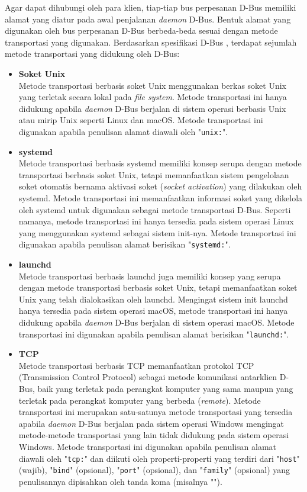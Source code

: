 Agar dapat dihubungi oleh para klien, tiap-tiap bus perpesanan D-Bus memiliki alamat yang diatur pada awal penjalanan \textit{daemon} D-Bus. Bentuk alamat yang digunakan oleh bus perpesanan D-Bus berbeda-beda sesuai dengan metode transportasi yang digunakan. Berdasarkan spesifikasi D-Bus \cite{dbus-specification}, terdapat sejumlah metode transportasi yang didukung oleh D-Bus:
\begin{itemize}
    \item \textbf{Soket Unix}\\
    Metode transportasi berbasis soket Unix menggunakan berkas soket Unix yang terletak secara lokal pada \textit{file system}. Metode transportasi ini hanya didukung apabila \textit{daemon} D-Bus berjalan di sistem operasi berbasis Unix atau mirip Unix seperti Linux dan macOS. Metode transportasi ini digunakan apabila penulisan alamat diawali oleh "\verb|unix:|".

    \item \textbf{systemd}\\
    Metode transportasi berbasis systemd memiliki konsep serupa dengan metode transportasi berbasis soket Unix, tetapi memanfaatkan sistem pengelolaan soket otomatis bernama aktivasi soket (\textit{socket activation}) yang dilakukan oleh systemd. Metode transportasi ini memanfaatkan informasi soket yang dikelola oleh systemd untuk digunakan sebagai metode transportasi D-Bus. Seperti namanya, metode transportasi ini hanya tersedia pada sistem operasi Linux yang menggunakan systemd sebagai sistem init-nya. Metode transportasi ini digunakan apabila penulisan alamat berisikan "\verb|systemd:|".
    
    \item \textbf{launchd}\\
    Metode transportasi berbasis launchd juga memiliki konsep yang serupa dengan metode transportasi berbasis soket Unix, tetapi memanfaatkan soket Unix yang telah dialokasikan oleh launchd. Mengingat sistem init launchd hanya tersedia pada sistem operasi macOS, metode transportasi ini hanya didukung apabila \textit{daemon} D-Bus berjalan di sistem operasi macOS. Metode transportasi ini digunakan apabila penulisan alamat berisikan "\verb|launchd:|".
    
    \item \textbf{TCP}\\
    Metode transportasi berbasis TCP memanfaatkan protokol TCP (Transmission Control Protocol) sebagai metode komunikasi antarklien D-Bus, baik yang terletak pada perangkat komputer yang sama maupun yang terletak pada perangkat komputer yang berbeda (\textit{remote}). Metode transportasi ini merupakan satu-satunya metode transportasi yang tersedia apabila \textit{daemon} D-Bus berjalan pada sistem operasi Windows mengingat metode-metode transportasi yang lain tidak didukung pada sistem operasi Windows. Metode transportasi ini digunakan apabila penulisan alamat diawali oleh "\verb|tcp:|" dan diikuti oleh properti-properti yang terdiri dari "\verb|host|" (wajib), "\verb|bind|" (opsional), "\verb|port|" (opsional), dan "\verb|family|" (opsional) yang penulisannya dipisahkan oleh tanda koma (misalnya "").


\end{itemize}
